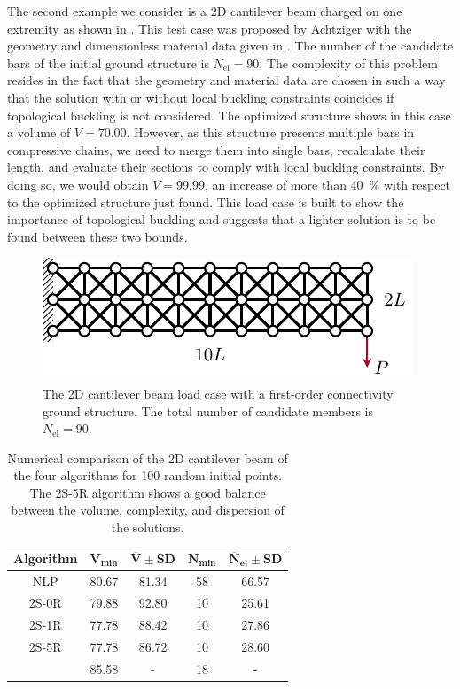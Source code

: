 The second example we consider is a 2D cantilever beam charged on one extremity as shown in . This test case was proposed by Achtziger  with the geometry and dimensionless material data given in . The number of the candidate bars of the initial ground structure is $N_{\text{el}}=90$. The complexity of this problem resides in the fact that the geometry and material data are chosen in such a way that the solution with or without local buckling constraints coincides if topological buckling is not considered. The optimized structure shows in this case a volume of $V=70.00$. However, as this structure presents multiple bars in compressive chains, we need to merge them into single bars, recalculate their length, and evaluate their sections to comply with local buckling constraints. By doing so, we would obtain $V=99.99$, an increase of more than \qty{40}{\%} with respect to the optimized structure just found. This load case is built to show the importance of topological buckling and suggests that a lighter solution is to be found between these two bounds.
\begin{figure}
    \centering
    \includegraphics{figures/04_TTO_improvements/11_Ach_cant/Ach_BC.pdf}
    \caption{The 2D cantilever beam load case with a first-order connectivity ground structure. The total number of candidate members is $N_{\text{el}}=90$.}
    \label{fig:04_2d_cant}
\end{figure}

\begin{table}
    \small
\centering
\begin{tabular}{cSS[table-format = 2.2(1), separate-uncertainty]S[table-format = 2.0]S[table-format = 2.2(1), separate-uncertainty]}
\toprule
\textbf{Algorithm} &
   &
   &
   &
   \\ \midrule
NLP & 80.67 & 81.34  & 58 & 66.57 \\
2S-0R & 79.88 & 92.80  & 10 & 25.61 \\
2S-1R & 77.78 & 88.42  & 10 & 27.86 \\
2S-5R & 77.78 & 86.72  & 10 & 28.60  \\
\midrule
\cite{achtziger_local_1999b} &85.58&{-}&18&{-}  \\\bottomrule
\end{tabular}
\caption{Numerical comparison of the 2D cantilever beam of the four algorithms for 100 random initial points. The 2S-5R algorithm shows a good balance between the volume, complexity, and dispersion of the solutions.}
\label{tab:04_2d_cant_solution}
\end{table}

